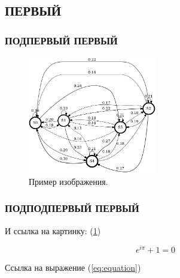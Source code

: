 \subsection{ПЕРВЫЙ}\label{sec:First}

\subsubsection{ПОДПЕРВЫЙ ПЕРВЫЙ}

\begin{figure}[H] %
    \centering %
    \includegraphics[width=0.5\textwidth]{images/chain.png} %
    \caption{Пример изображения.} %
    \label{fig:example} %
\end{figure}

\subsubsection{ПОДПОДПЕРВЫЙ ПЕРВЫЙ}

И ссылка на картинку: (\ref{fig:example})

\begin{equation}\label{eq:equation}
    e^{i\pi}+1=0
\end{equation}

\noindent Ссылка на выражение (\ref{eq:equation})

\newpage
